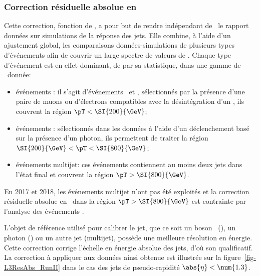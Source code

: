 \subsubsection{Correction résiduelle absolue en \pT}\label{chapter-JERC-section-CMS-subsec-residuals_pT}
Cette correction, fonction de \pT, a pour but de rendre indépendant de \pT\ le rapport données sur simulations de la réponse des jets.
Elle combine, à l'aide d'un ajustement global, les comparaisons données-simulations de plusieurs types d'événements afin de couvrir un large spectre de valeurs de \pT. Chaque type d'événement est en effet dominant, de par sa statistique, dans une gamme de \pT\ donnée:
\begin{itemize}
\item événements \Zjets: il s'agit d'événements \Zmmjets\ et \Zeejets, sélectionnés par la présence d'une paire de muons ou d'électrons compatibles avec la désintégration d'un \Zboson, ils couvrent la région $\pT<\SI{200}{\GeV}$;
\item événements \Gjets: sélectionnés dans les données à l'aide d'un déclenchement basé sur la présence d'un photon, ils permettent de traiter la région $\SI{200}{\GeV}<\pT<\SI{800}{\GeV}$;
\item événements multijet: ces événements contiennent au moins deux jets dans l'état final et couvrent la région $\pT>\SI{800}{\GeV}$.
\end{itemize}
En 2017 et 2018, les événements multijet n'ont pas été exploités et la correction résiduelle absolue en \pT\ dans la région $\pT>\SI{800}{\GeV}$ est contrainte par l'analyse des événements \Gjets.
\par L'objet de référence utilisé pour calibrer le jet, que ce soit un boson \Zboson\ (\Zjets), un photon (\Gjets) ou un autre jet (multijet), possède une meilleure résolution en énergie.
Cette correction corrige l'échelle en énergie absolue des jets, d'où son qualificatif. %
La correction à appliquer aux données ainsi obtenue est illustrée sur la figure~\ref{fig-L3ResAbs_RunII} dans le cas des jets de pseudo-rapidité $\abs{\eta}<\num{1.3}$.
